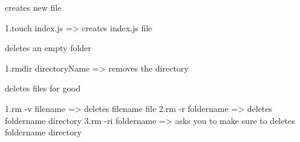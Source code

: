 creates new file

1.touch index.js => creates index.js file


deletes an empty folder 

1.rmdir directoryName => removes the directory


deletes files for good

1.rm -v filename => deletes filename file
2.rm -r foldername => deletes foldername directory
3.rm -ri foldername => asks you to make sure to deletes foldername directory






